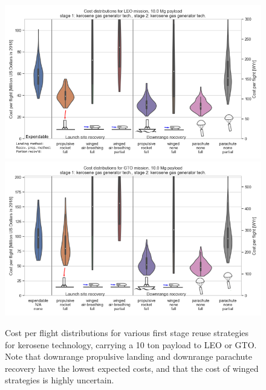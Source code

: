 \documentclass[conf]{new-aiaa}
\begin{document}
\begin{multicols}{2}
\begin{figure}
    \centering
    \includegraphics[width=\textwidth]{strategy_cost_annotated/LEO_kero}
     \includegraphics[width=\textwidth]{strategy_cost_annotated/GTO_kero}
    \caption{\label{fig:strategy_cost_kerosene} Cost per flight distributions for various first stage reuse strategies for kerosene technology, carrying a 10 ton payload to LEO or GTO. Note that downrange propulsive landing and downrange parachute recovery have the lowest expected costs, and that the cost of winged strategies is highly uncertain.}
\end{figure}


\end{multicols}
\end{document}
